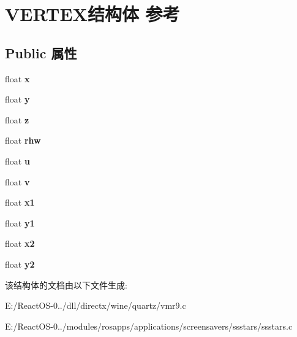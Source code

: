 \hypertarget{struct_v_e_r_t_e_x}{}\section{V\+E\+R\+T\+E\+X结构体 参考}
\label{struct_v_e_r_t_e_x}
\subsection*{Public 属性}
\begin{DoxyCompactItemize}
\item 
\mbox{\label{struct_v_e_r_t_e_x_a49987cf76b2b738e89d100bedf7ca21a}} 
float {\bfseries x}
\item 
\mbox{\label{struct_v_e_r_t_e_x_abfe9878ceed7a687387eeee9ff0279ba}} 
float {\bfseries y}
\item 
\mbox{\label{struct_v_e_r_t_e_x_ad270a2dd1045d7e3480e74045d1266e6}} 
float {\bfseries z}
\item 
\mbox{\label{struct_v_e_r_t_e_x_aab973b1af56d7f664a8655d193865cf2}} 
float {\bfseries rhw}
\item 
\mbox{\label{struct_v_e_r_t_e_x_afe70335bf8eed0f15437a2a6a9e74778}} 
float {\bfseries u}
\item 
\mbox{\label{struct_v_e_r_t_e_x_a8a90c3ae30b078754fb385c9f6fe9f69}} 
float {\bfseries v}
\item 
\mbox{\label{struct_v_e_r_t_e_x_a664daa973f7a52507c86dec582efee78}} 
float {\bfseries x1}
\item 
\mbox{\label{struct_v_e_r_t_e_x_a69f2fbd058179458f404823e0e56ca8d}} 
float {\bfseries y1}
\item 
\mbox{\label{struct_v_e_r_t_e_x_abb415a9dca82f0619fa9711a06a1c319}} 
float {\bfseries x2}
\item 
\mbox{\label{struct_v_e_r_t_e_x_a2c80a2430ea2180a553c5d36c3ff705c}} 
float {\bfseries y2}
\end{DoxyCompactItemize}


该结构体的文档由以下文件生成\+:\begin{DoxyCompactItemize}
\item 
E\+:/\+React\+O\+S-\/0../dll/directx/wine/quartz/vmr9.\+c\item 
E\+:/\+React\+O\+S-\/0../modules/rosapps/applications/screensavers/ssstars/ssstars.\+c\end{DoxyCompactItemize}
